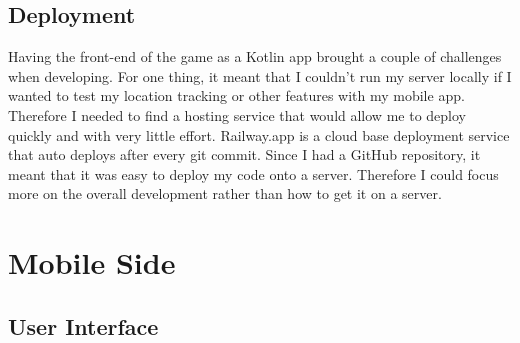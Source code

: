 \documentclass{l4proj}
\begin{document}
\subsection{Deployment}
\label{deployment}
Having the front-end of the game as a Kotlin app brought a couple of challenges when developing. For one thing, it meant
that I couldn't run my server locally if I wanted to test my location tracking or other features with my mobile app. Therefore
I needed to find a hosting service that would allow me to deploy quickly and with very little effort. Railway.app \citep{railway}
is a cloud base deployment service that auto deploys after every git commit. Since I had a GitHub repository, it meant that it was
easy to deploy my code onto a server. Therefore I could focus more on the overall development rather than how to get it on a server.

\section{Mobile Side}

\subsection{User Interface}
\label{implementationui}
\end{document}
